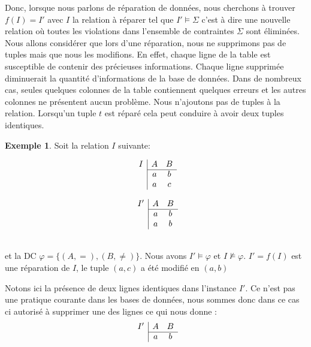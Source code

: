 \documentclass[letterpaper, 12pt]{report}
\theoremstyle{definition}
\newtheorem{myexample}{Exemple}
\begin{document}
Donc, lorsque nous parlons de réparation de données, nous cherchons à trouver $f(I) = I'$ avec $I$ la relation à réparer tel que $I' \models \Sigma$ c'est à dire une nouvelle relation où toutes les violations dans l'ensemble de contraintes $\Sigma$ sont éliminées. Nous allons considérer que lors d'une réparation, nous ne supprimons pas de tuples mais que nous les modifions. En effet, chaque ligne de la table est susceptible de contenir des précieuses informations. Chaque ligne supprimée diminuerait la quantité d'informations de la base de données. Dans de nombreux cas, seules quelques colonnes de la table contiennent quelques erreurs et les autres colonnes ne présentent aucun problème.  Nous n'ajoutons pas de tuples à la relation. Lorsqu'un tuple $t$ est réparé cela peut conduire à avoir deux tuples identiques. \\

\begin{myexample}
	Soit la relation $I$ suivante:\\
	\begin{minipage}{.45\textwidth}\centering
		$$
		\begin{array}{c|cc}
		I & A & B\\\cline{2-3}
 		 & a & b\\
 		 & a & c
		\end{array}  
		$$
	\end{minipage}
	\begin{minipage}{.45\textwidth}\centering
		$$
		\begin{array}{c|cc}
		I' & A & B\\\cline{2-3}
 		 & a & b\\
 		 & a & b
		\end{array}  
		$$
	\end{minipage}~\\
et la DC $\varphi = \{ (A,=),(B,\neq)\}$. Nous avons $I' \models \varphi$ et $I \not\models \varphi$. $I' = f(I)$ est une réparation de $I$, le tuple $(a,c)$ a été modifié en $(a,b)$

Notons ici la présence de deux lignes identiques dans l'instance $I'$. Ce n'est pas une pratique courante dans les bases de données, nous sommes donc dans ce cas ci autorisé à supprimer une des lignes ce qui nous donne :\\
$$
		\begin{array}{c|cc}
		I' & A & B\\\cline{2-3}
 		 & a & b
		\end{array}  
		$$
\end{myexample}
\end{document}
